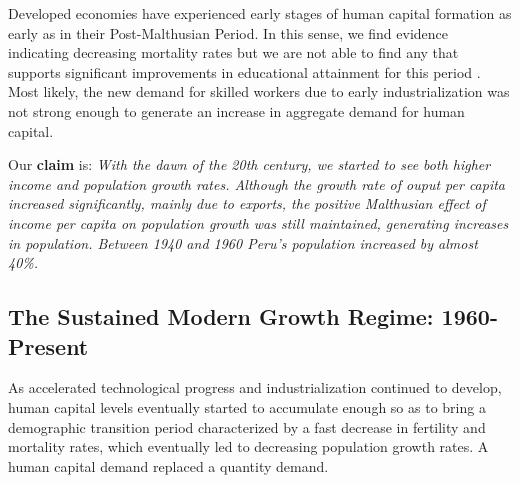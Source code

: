 \documentclass[12pt]{article}%
\begin{document}
Developed economies have experienced early stages of human capital formation as early as in their Post-Malthusian Period. In this sense, we find evidence indicating decreasing mortality rates but we are not able to find any that supports significant improvements in educational attainment for this period . Most likely, the new demand for skilled workers due to early industrialization was not strong enough to generate an increase in aggregate demand for human capital.

Our \textbf{claim} is: \emph{With the dawn of the 20th century, we started to see both higher income and population growth rates. Although the growth rate of ouput per capita increased significantly, mainly due to exports, the positive Malthusian effect of income per capita on population growth was still maintained, generating increases in population. Between 1940 and 1960 Peru's population increased by almost 40\%. }
\subsection{The Sustained Modern Growth Regime: 1960-Present}
As accelerated technological progress and industrialization continued to develop, human capital levels eventually started to accumulate enough so as to bring a demographic transition period characterized by a fast decrease in fertility and mortality rates, which eventually led to decreasing population growth rates. A human capital demand replaced a quantity demand.
\end{document}

